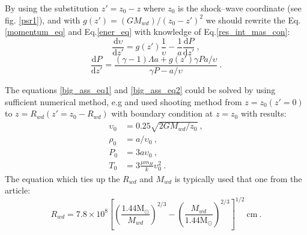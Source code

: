 \documentclass[oneside,a4paper,11pt]{report}
\begin{document}
By using the substitution $z' = z_0 - z$ where $z_0$ is the shock--wave coordinate (see fig. \ref{psr1}),
and with $g(z') = (GM_{wd})/(z_0 - z')^2$ we should rewrite the Eq.\eqref{momentum_eq} and Eq.\eqref{ener_eq} 
with knowledge of Eq.\eqref{res_int_mas_con}:
\begin{equation}
 \label{big_ass_eq1}
\frac{\mathrm{d} \upsilon}{\mathrm{d} z'} = g(z')\frac{1}{\upsilon}-\frac{1}{a}\frac{\mathrm{d}P}{\mathrm{d}z'} \:,
\end{equation}
\begin{equation}
 \label{big_ass_eq2}
\frac{\mathrm{d}P}{\mathrm{d}z'} = \frac{(\gamma -1) \Lambda a + g(z')\gamma Pa / \upsilon}{\gamma P -a / \upsilon } \:.
\end{equation}

The equations \eqref{big_ass_eq1} and \eqref{big_ass_eq2} could be solved by using sufficient 
numerical method, e.g \citet{2005A&A...435..191S} and  \citet{1999MNRAS.306..684C} used shooting 
method from $z=z_0(z'=0)$ to $z = R_{wd}(z'=z_0-R_{wd})$ with boundary condition at $z=z_0$ with results:
\begin{equation}
 \label{res_shoot}
\begin{split}
\upsilon_0 &= 0.25\sqrt{2GM_{wd}/z_0}\:,\\
\rho_0 &= a / \upsilon_0\:,\\
P_0 &= 3a\upsilon_0\:,\\
T_0 &= 3\frac{\mu m_H}{k}\upsilon_0^2\:. 
\end{split}
\end{equation}
The equation which ties up the $R_{wd}$ and $M_{wd}$ is typically used that one from 
the \citet{1972ApJ...175..417N} article:
\begin{equation}
 \label{rwd_mwd}
R_{wd} = 7.8 \times 10^8 \left[ \left( \frac{1.44\mathrm{M_\odot}}{M_{wd}} \right)^{2/3} -\left( \frac{M_{wd}}{1.44\mathrm{M_\odot}} \right)^{2/3} \right]^{1/2}\:\mathrm{cm}\:.
\end{equation}
  
\end{document}
